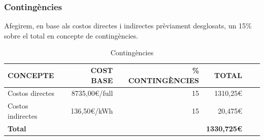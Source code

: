 \begin{table}[htb]
\centering
\label{PressupostIndirectes}
\caption{Costos indirectes i amortitzacions}
\end{table}
\subsubsection{Contingències}

Afegirem, en base als costos directes i indirectes prèviament desglosats, un 15\% sobre el total en concepte de contingències.

\begin{table}[htb]
\centering
\label{PressupostContingencies}
\begin{tabular}{lrrrrr}
\hline \textbf{CONCEPTE}                           & {\color[HTML]{000000} \textbf{COST BASE}} & {\color[HTML]{000000} \textbf{\% CONTINGÈNCIES}} & {\color[HTML]{000000} \textbf{TOTAL}}\\ 
\hline
Costos directes                             & 8735,00\euro /full                                           & 15                                             & 1310,25\euro\\
Costos indirectes                                 & 136,50\euro /kWh                                           & 15                                           & 20,475\euro\\
\hline
\textbf{Total}                               &                              &                                & \textbf{1330,725\euro}       \\
\hline                      
\end{tabular}%
\caption{Contingències}
\end{table}


